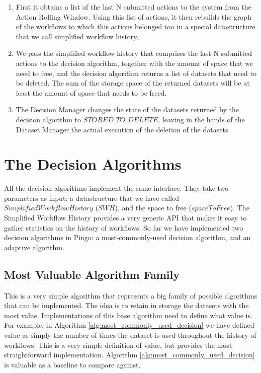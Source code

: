 \begin{enumerate}
\item First it obtains a list of the last N submitted actions to the system from the Action Rolling Window. Using this list of actions, it then rebuilds the graph of the workflows to which this actions belonged too in a special datastructure that we call simplified workflow history.
\item We pass the simplified workflow history that comprises the last N submitted actions to the decision algorithm, together with the amount of space that we need to free, and the decision algorithm returns a list of datasets that need to be deleted. The sum of the storage space of the returned datasets will be at least the amount of space that needs to be freed.
\item The Decision Manager changes the state of the datasets returned by the decision algorithm to $STORED\_TO\_DELETE$, leaving in the hands of the Dataset Manager the actual execution of the deletion of the datasets.

\end{enumerate}

\section{The Decision Algorithms}
All the decision algorithms implement the same interface.  They take two parameters as input: a datastructure that we have called $Simplified Workflow History$ ($SWH$), and the space to free ($spaceToFree$).  The Simplified Workflow History provides a very generic API that makes it easy to gather statistics on the history of workflows.
So far we have implemented two decision algorithms in Pingo: a most-commonly-used decision algorithm, and an adaptive algorithm.

\subsection{Most Valuable Algorithm Family}
This is a very simple algorithm that represents a big family of possible algorithms that can be implemented.  The idea is to retain in storage the datasets with the most value.  Implementations of this base algorithm need to define what value is.  For example, in Algorithm \ref{alg:most_commonly_used_decision} we have defined value as simply the number of times the dataset is used throughout the history of workflows. This is a very simple definition of value, but provides the most straightforward implementation.  Algorithm \ref{alg:most_commonly_used_decision} is valuable as a baseline to compare against.

